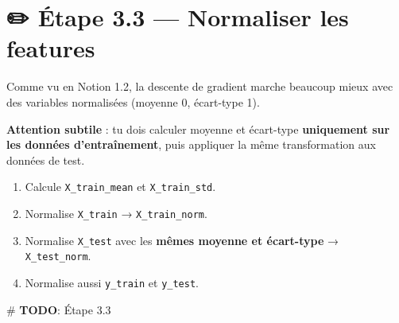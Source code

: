 \documentclass[
  french,
  11pt,
  a4paper,
]{scrbook}
\newenvironment{Shaded}{}{}
\newcommand{\AlertTok}[1]{\textcolor[rgb]{1.00,0.33,0.33}{\textbf{#1}}}
\newcommand{\CommentTok}[1]{\textcolor[rgb]{0.42,0.45,0.49}{#1}}
\providecommand{\tightlist}{%
  \setlength{\itemsep}{0pt}\setlength{\parskip}{0pt}}
\begin{document}
\section{✏️ Étape 3.3 --- Normaliser les
features}\label{uxe9tape-3.3-normaliser-les-features}

\begin{tcolorbox}[enhanced jigsaw, arc=.35mm, bottomrule=.15mm, bottomtitle=1mm, breakable, colback=white, colbacktitle=quarto-callout-note-color!10!white, colframe=quarto-callout-note-color-frame, coltitle=black, left=2mm, leftrule=.75mm, opacityback=0, opacitybacktitle=0.6, rightrule=.15mm, title={📝 À faire}, titlerule=0mm, toprule=.15mm, toptitle=1mm]

Comme vu en Notion 1.2, la descente de gradient marche beaucoup mieux
avec des variables normalisées (moyenne 0, écart-type 1).

\textbf{Attention subtile} : tu dois calculer moyenne et écart-type
\textbf{uniquement sur les données d'entraînement}, puis appliquer la
même transformation aux données de test.

\begin{enumerate}
\def\labelenumi{\arabic{enumi}.}
\tightlist
\item
  Calcule \texttt{X\_train\_mean} et \texttt{X\_train\_std}.
\item
  Normalise \texttt{X\_train} → \texttt{X\_train\_norm}.
\item
  Normalise \texttt{X\_test} avec les \textbf{mêmes moyenne et
  écart-type} → \texttt{X\_test\_norm}.
\item
  Normalise aussi \texttt{y\_train} et \texttt{y\_test}.
\end{enumerate}

\end{tcolorbox}

\begin{Shaded}
\begin{Highlighting}[]
\CommentTok{\# }\AlertTok{TODO}\CommentTok{: Étape 3.3}
\end{Highlighting}
\end{Shaded}
\end{document}
